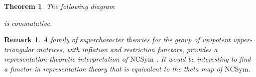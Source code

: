 \documentclass[11pt]{amsart}
\newtheorem{Theorem}{Theorem}[section]
\newtheorem*{remark}{Remark}
\numberwithin{equation}{section}
\newcommand{\NSym}{\mathrm{NSym}}
\newcommand{\NCQSym}{\mathrm{NCQSym}}
\newcommand{\NCSym}{\mathrm{NCSym}}
\newcommand{\NCPeak}{\mathrm{NC}\Pi}
\newcommand{\scrY}{{\mathscr{Y}}}
\newcommand{\scrF}{{\mathscr{F}}}
\newcommand{\frakS}{{\mathfrak{S}}}
\newcommand{\bfG}{{\mathbf{G}}}
\newcommand{\cf}{{\mathrm{cf}}}
\begin{document}
\begin{Theorem}
The following diagram 
\begin{center}
\end{center}
is commutative.
\end{Theorem}

\begin{remark} A family of supercharacter theories for the group of unipotent upper-triangular matrices, with inflation and restriction functors, provides a representation-theoretic interpretation of $\NCSym$ \cite{ABT}. It would be interesting to find a functor in representation theory that is equivalent to the theta map of $\NCSym$. 
\end{remark} 
\end{document}
